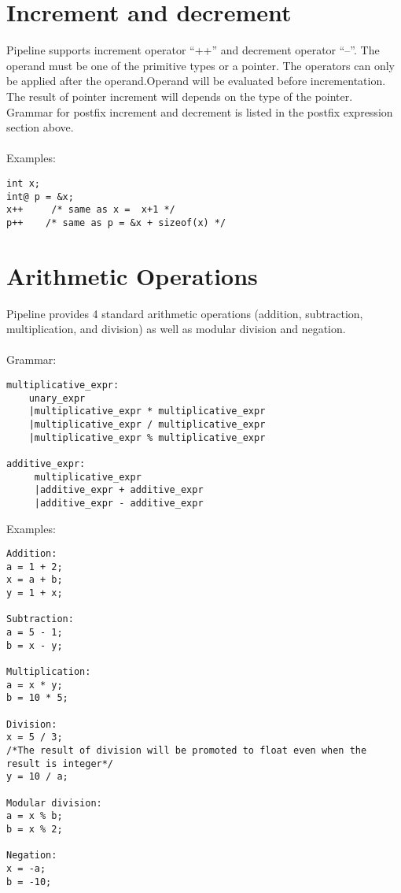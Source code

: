 \documentclass[./LRM_main.tex]{subfiles}
\begin{document}
\section{Increment and decrement}
Pipeline supports increment operator “++” and  decrement operator “--”. The operand must be one of the primitive types or a pointer. The operators can only be applied after the operand.Operand will be evaluated before incrementation.\\
The result of pointer increment will depends on the type of the pointer.\\
Grammar for postfix increment and decrement is listed in the postfix expression section above.\\
\vspace{1 mm}\\
Examples:
\begin{lstlisting}
int x;
int@ p = &x;
x++     /* same as x =  x+1 */
p++    /* same as p = &x + sizeof(x) */ 
\end{lstlisting}
\section{Arithmetic Operations}
Pipeline provides 4 standard arithmetic operations (addition, subtraction, multiplication, and division) as well as modular division and negation.\\
\vspace{1 mm}\\
Grammar:
\begin{lstlisting}
multiplicative_expr:
    unary_expr
    |multiplicative_expr * multiplicative_expr
    |multiplicative_expr / multiplicative_expr
    |multiplicative_expr % multiplicative_expr

additive_expr:
     multiplicative_expr
     |additive_expr + additive_expr
     |additive_expr - additive_expr

\end{lstlisting}
\pagebreak
Examples:
\begin{lstlisting}
Addition:
a = 1 + 2;
x = a + b;
y = 1 + x;

Subtraction:
a = 5 - 1;
b = x - y;

Multiplication:
a = x * y;
b = 10 * 5;

Division:
x = 5 / 3; 
/*The result of division will be promoted to float even when the result is integer*/
y = 10 / a;

Modular division:
a = x % b;
b = x % 2;

Negation:
x = -a;
b = -10;
\end{lstlisting}
\end{document}
